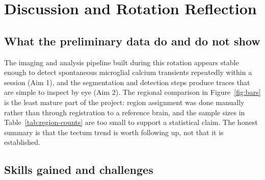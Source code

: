 \section{Discussion and Rotation Reflection}

\subsection{What the preliminary data do and do not show}

The imaging and analysis pipeline built during this rotation appears stable enough to
detect spontaneous microglial calcium transients repeatedly within a session (Aim 1),
and the segmentation and detection steps produce traces that are simple to inspect by
eye (Aim 2). The regional comparison in Figure~\ref{fig:bars} is the least mature part
of the project: region assignment was done manually rather than through registration
to a reference brain, and the sample sizes in Table~\ref{tab:region-counts} are too
small to support a statistical claim. The honest summary is that the tectum trend is
worth following up, not that it is established.

\subsection{Skills gained and challenges}

